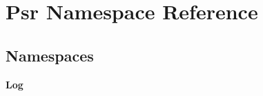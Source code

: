 \section{Psr Namespace Reference}
\label{namespace_psr}
\subsection*{Namespaces}
\begin{DoxyCompactItemize}
\item 
 {\bf Log}
\end{DoxyCompactItemize}
